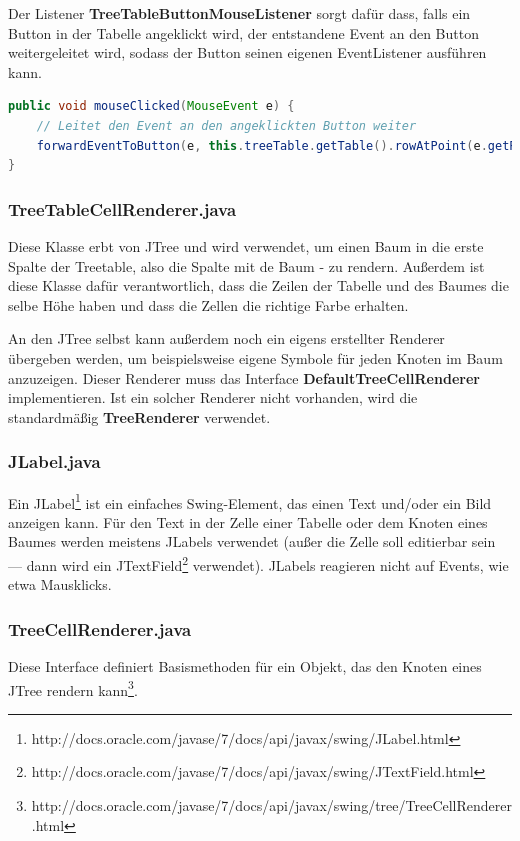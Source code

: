 Der Listener \textbf{TreeTableButtonMouseListener} sorgt dafür dass, falls ein Button in der Tabelle angeklickt wird, der entstandene Event an den Button weitergeleitet wird, sodass der Button seinen eigenen EventListener ausführen kann.
\begin{lstlisting}[language=JAVA]
public void mouseClicked(MouseEvent e) {
	// Leitet den Event an den angeklickten Button weiter
	forwardEventToButton(e, this.treeTable.getTable().rowAtPoint(e.getPoint()), this.treeTable.getTable().columnAtPoint(e.getPoint()));
}
\end{lstlisting}

\subsubsection*{TreeTableCellRenderer.java}
Diese Klasse erbt von JTree und wird verwendet, um einen Baum in die erste Spalte der Treetable, also die Spalte mit de Baum - zu rendern. Außerdem ist diese Klasse dafür verantwortlich, dass die Zeilen der Tabelle und des Baumes die selbe Höhe haben und dass die Zellen die richtige Farbe erhalten.

An den JTree selbst kann außerdem noch ein eigens erstellter Renderer übergeben werden, um beispielsweise eigene Symbole für jeden Knoten im Baum anzuzeigen. Dieser Renderer muss das Interface \textbf{DefaultTreeCellRenderer} implementieren. Ist ein solcher Renderer nicht vorhanden, wird die standardmäßig \textbf{TreeRenderer} verwendet.

\subsubsection*{JLabel.java}
Ein JLabel\footnote{http://docs.oracle.com/javase/7/docs/api/javax/swing/JLabel.html} ist ein einfaches Swing-Element, das einen Text und/oder ein Bild anzeigen kann. Für den Text in der Zelle einer Tabelle oder dem Knoten eines Baumes werden meistens JLabels verwendet (außer die Zelle soll editierbar sein --- dann wird ein JTextField\footnote{http://docs.oracle.com/javase/7/docs/api/javax/swing/JTextField.html} verwendet). JLabels reagieren nicht auf Events, wie etwa Mausklicks.

\subsubsection*{TreeCellRenderer.java}
Diese Interface definiert Basismethoden für ein Objekt, das den Knoten eines JTree rendern kann\footnote{http://docs.oracle.com/javase/7/docs/api/javax/swing/tree/TreeCellRenderer.html}.

